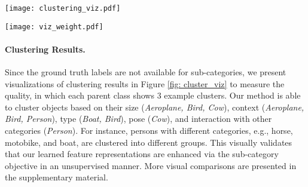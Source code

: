 \documentclass[10pt,twocolumn,letterpaper]{article}
\begin{document}
\begin{figure*}[t]
	\centering
	\texttt{[image: clustering\_viz.pdf]}\\
	\vspace{-2mm}
	\caption{Clustering results of the last round model (\#3). We show 3 clusters for each parent class and demonstrate that our learned features are able to cluster objects based on their size (\textit{Aeroplane, Bird, Cow}), context (\textit{Aeroplane, Bird, Person}), type (\textit{Boat, Bird}), pose (\textit{Cow}), and interaction with other categories (\textit{Person}).
	}
	\label{fig: cluster_viz}
\end{figure*}

\begin{figure*}[t]
	\centering
	\texttt{[image: viz\_weight.pdf]}\\
\caption{Visualizations of weights based on the 
	t-SNE method that illustrates the relationships on semantic-level between parent classifier and the person sub-category classifier. We show that one person sub-category is usually close to one parent class, as they often co-appear in the same image, as shown in example images on two sides.}
	\label{fig: weight_viz}
\end{figure*}


\paragraph{Clustering Results.}
Since the ground truth labels are not available for sub-categories, we present visualizations of clustering results in Figure \ref{fig: cluster_viz} to measure the quality, in which each parent class shows 3 example clusters. 
Our method is able to cluster objects based on their size (\textit{Aeroplane, Bird, Cow}), context (\textit{Aeroplane, Bird, Person}), type (\textit{Boat, Bird}), pose (\textit{Cow}), and interaction with other categories (\textit{Person}).
For instance, persons with different categories, e.g., horse, motobike, and boat, are clustered into different groups.
This visually validates that our learned feature representations are enhanced via the sub-category objective in an unsupervised manner.
More visual comparisons are presented in the supplementary material.
\end{document}
